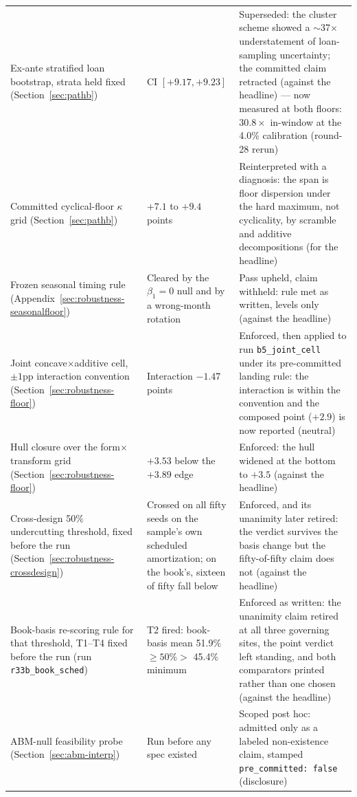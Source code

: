 \documentclass[12pt]{article}
\begin{document}
\begin{table}[H]
\begin{threeparttable}
\begin{tabular}{@{}p{4.4cm}p{4.2cm}p{5.6cm}@{}}
Ex-ante stratified loan bootstrap, strata held fixed (Section~\ref{sec:pathb}) & CI $[+9.17, +9.23]$ & Superseded: the cluster scheme showed a $\sim$37$\times$ understatement of loan-sampling uncertainty; the committed claim retracted (against the headline)  --- now measured at both floors: $30.8\times$ in-window at the 4.0\% calibration (round-28 rerun)\\
Committed cyclical-floor $\kappa$ grid (Section~\ref{sec:pathb}) & $+7.1$ to $+9.4$ points & Reinterpreted with a diagnosis: the span is floor dispersion under the hard maximum, not cyclicality, by scramble and additive decompositions (for the headline) \\
Frozen seasonal timing rule (Appendix~\ref{sec:robustness-seasonalfloor}) & Cleared by the $\beta_1 = 0$ null and by a wrong-month rotation & Pass upheld, claim withheld: rule met as written, levels only (against the headline) \\
Joint concave$\times$additive cell, $\pm 1$pp interaction convention (Section~\ref{sec:robustness-floor}) & Interaction $-1.47$ points & Enforced, then applied to run \texttt{b5\_joint\_cell} under its pre-committed landing rule: the interaction is within the convention and the composed point ($+2.9$) is now reported (neutral)\\
Hull closure over the form$\times$transform grid (Section~\ref{sec:robustness-floor}) & $+3.53$ below the $+3.89$ edge & Enforced: the hull widened at the bottom to $+3.5$ (against the headline) \\
Cross-design 50\% undercutting threshold, fixed before the run (Section~\ref{sec:robustness-crossdesign}) & Crossed on all fifty seeds on the sample's own scheduled amortization; on the book's, sixteen of fifty fall below & Enforced, and its unanimity later retired: the verdict survives the basis change but the fifty-of-fifty claim does not (against the headline) \\
Book-basis re-scoring rule for that threshold, T1--T4 fixed before the run (run \texttt{r33b\_book\_sched}) & T2 fired: book-basis mean 51.9\% $\geq 50\% >$ 45.4\% minimum & Enforced as written: the unanimity claim retired at all three governing sites, the point verdict left standing, and both comparators printed rather than one chosen (against the headline) \\
ABM-null feasibility probe (Section~\ref{sec:abm-interp}) & Run before any spec existed & Scoped post hoc: admitted only as a labeled non-existence claim, stamped \texttt{pre\_committed: false} (disclosure) \\

\end{tabular}
\end{threeparttable}
\end{table}
\end{document}
